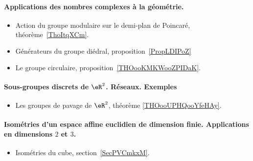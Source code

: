 \paragraph{Applications des nombres complexes à la géométrie.}
\begin{itemize}
    \item Action du groupe modulaire sur le demi-plan de Poincaré, théorème~\ref{ThoItqXCm}.
    \item Générateurs du groupe diédral, proposition~\ref{PropLDIPoZ}
    \item Le groupe circulaire, proposition~\ref{THOooKMKWooZPIDaK}.
\end{itemize}
\paragraph{Sous-groupes discrets de \( \eR^2\). Réseaux. Exemples}
\begin{itemize}
    \item Les groupes de pavage de \( \eR^2\), théorème \ref{THOooUPHQooYfeHAy}.
\end{itemize}
\paragraph{Isométries d'un espace affine euclidien de dimension finie. Applications en dimensions $2$ et $3$.}
\begin{itemize}
    \item Isométries du cube, section~\ref{SecPVCmkxM}.
\end{itemize}
